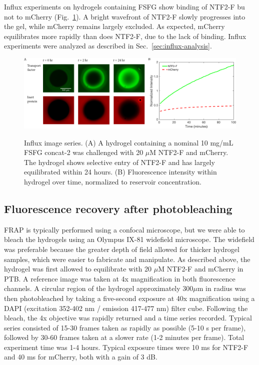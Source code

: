 Influx experiments on hydrogels containing FSFG show binding of NTF2-F bu not to mCherry (Fig.~\ref{fig:influx-images}).  A bright wavefront  of NTF2-F slowly progresses into the gel, while mCherry remains largely excluded.  As expected, mCherry equilibrates more rapidly than does NTF2-F, due to the lack of binding.  Influx experiments were analyzed as described in Sec.~\ref{sec:influx-analysis}.

\begin{figure}
\caption[Influx experiments images and accumulation.]{Influx image series.  (A) A hydrogel containing a nominal 10 mg/mL FSFG concat-2 was challenged with 20 $\mu$M NTF2-F and mCherry.  The hydrogel shows selective entry of NTF2-F and has largely equilibrated within 24 hours. (B) Fluorescence intensity within hydrogel over time, normalized to reservoir concentration.}
\centering
\includegraphics[width=\textwidth]{figs/ch04/influx-images-clean.pdf}
\label{fig:influx-images}
\end{figure} 

\subsection{Fluorescence recovery after photobleaching}

FRAP is typically performed using a confocal microscope, but we were able to bleach the hydrogels using an Olympus IX-81 widefield microscope.  The widefield was preferable because the greater depth of field allowed for thicker hydrogel samples, which were easier to fabricate and manipulate.  As described above, the hydrogel was first allowed to equilibrate with 20 $\mu$M NTF2-F and mCherry in PTB.  A reference image was taken at 4x magnification in both fluorescence channels.  A circular region of the hydrogel approximately $300 \mu$m in radius was then photobleached by taking a five-second exposure at 40x magnification using a DAPI (excitation 352-402 nm / emission 417-477 nm) filter cube.  Following the bleach, the 4x objective was rapidly returned and a time series recorded.  Typical series consisted of 15-30 frames taken as rapidly as possible (5-10 s per frame), followed by 30-60 frames taken at a slower rate (1-2 minutes per frame).  Total experiment time was 1-4 hours.  Typical exposure times were 10 ms for NTF2-F and 40 ms for mCherry, both with a gain of 3 dB.

